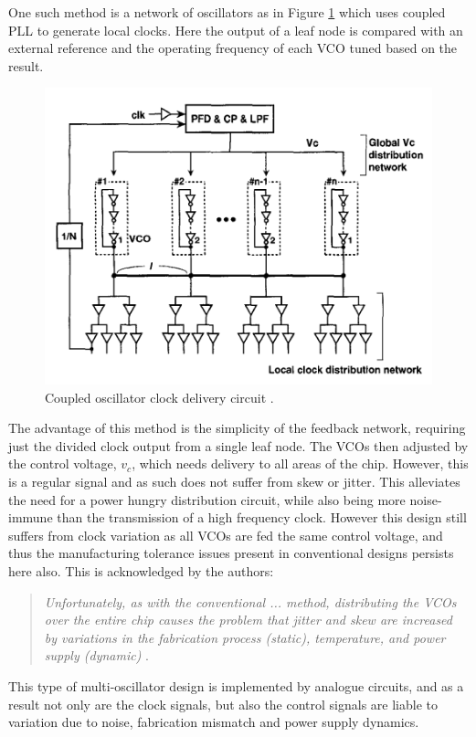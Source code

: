 One such method is a network of oscillators as in Figure \ref{fig:mizuno1998noise} which uses coupled \ac{PLL} to generate local clocks. Here the output of a leaf node is compared with an external reference and the operating frequency of each \ac{VCO} tuned based on the result.
\begin{figure}[h]
	\centering
	\includegraphics[scale=0.7]{../mizuno1998noise}
	\caption[Coupled oscillator clock delivery circuit]{Coupled oscillator clock delivery circuit \cite{mizuno1998noise}.}
	\label{fig:mizuno1998noise}
\end{figure}
The advantage of this method is the simplicity of the feedback network, requiring just the divided clock output from a single leaf node. The \ac{VCO}s then adjusted by the control voltage, $v_c$, which needs delivery to all areas of the chip. However, this is a regular signal and as such does not suffer from skew or jitter. This alleviates the need for a power hungry distribution circuit, while also being more noise-immune than the transmission of a high frequency clock. However this design still suffers from clock variation as all \ac{VCO}s are fed the same control voltage, and thus the manufacturing tolerance issues present in conventional designs persists here also. This is acknowledged by the authors:
\begin{quotation}
	\textit{Unfortunately, as with the conventional ... method, distributing the \ac{VCO}s over the entire chip causes the problem that jitter and skew are increased by variations in the fabrication process (static), temperature, and power supply (dynamic)} \cite{mizuno1998noise}.
\end{quotation}
This type of multi-oscillator design is implemented by analogue circuits, and as a result not only are the clock signals, but also the control signals are liable to variation due to noise, fabrication mismatch and power supply dynamics.

